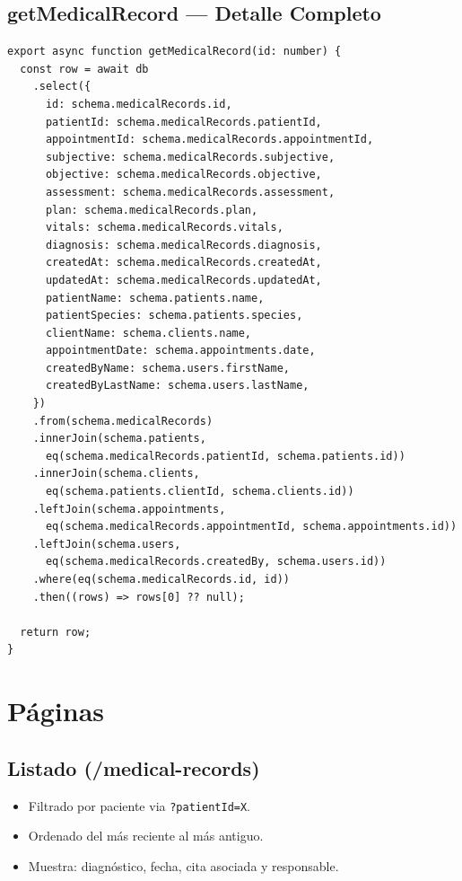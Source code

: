 \subsection{getMedicalRecord --- Detalle Completo}

\begin{lstlisting}[style=typescript, caption=getMedicalRecord - Joins para vista detalle]
export async function getMedicalRecord(id: number) {
  const row = await db
    .select({
      id: schema.medicalRecords.id,
      patientId: schema.medicalRecords.patientId,
      appointmentId: schema.medicalRecords.appointmentId,
      subjective: schema.medicalRecords.subjective,
      objective: schema.medicalRecords.objective,
      assessment: schema.medicalRecords.assessment,
      plan: schema.medicalRecords.plan,
      vitals: schema.medicalRecords.vitals,
      diagnosis: schema.medicalRecords.diagnosis,
      createdAt: schema.medicalRecords.createdAt,
      updatedAt: schema.medicalRecords.updatedAt,
      patientName: schema.patients.name,
      patientSpecies: schema.patients.species,
      clientName: schema.clients.name,
      appointmentDate: schema.appointments.date,
      createdByName: schema.users.firstName,
      createdByLastName: schema.users.lastName,
    })
    .from(schema.medicalRecords)
    .innerJoin(schema.patients,
      eq(schema.medicalRecords.patientId, schema.patients.id))
    .innerJoin(schema.clients,
      eq(schema.patients.clientId, schema.clients.id))
    .leftJoin(schema.appointments,
      eq(schema.medicalRecords.appointmentId, schema.appointments.id))
    .leftJoin(schema.users,
      eq(schema.medicalRecords.createdBy, schema.users.id))
    .where(eq(schema.medicalRecords.id, id))
    .then((rows) => rows[0] ?? null);

  return row;
}
\end{lstlisting}

\section{P\'aginas}

\subsection{Listado (/medical-records)}

\begin{itemize}[leftmargin=*]
    \item Filtrado por paciente via \texttt{?patientId=X}.
    \item Ordenado del m\'as reciente al m\'as antiguo.
    \item Muestra: diagn\'ostico, fecha, cita asociada y responsable.
\end{itemize}

